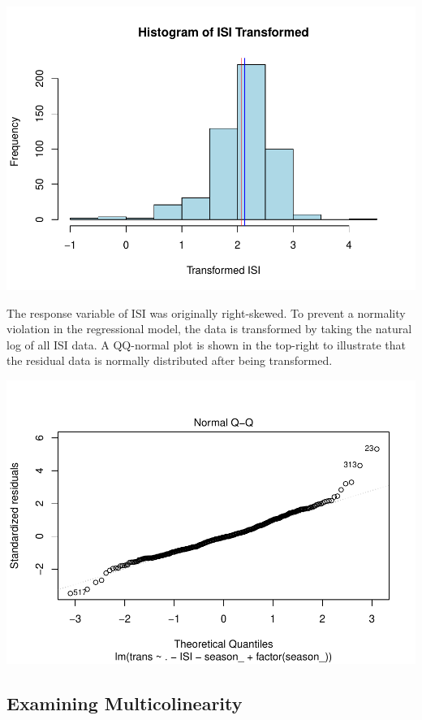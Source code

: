\documentclass[conference,final,]{IEEEtran}
\makeatletter
\def\maxwidth{\ifdim\Gin@nat@width>\linewidth\linewidth
\else\Gin@nat@width\fi}
\let\Oldincludegraphics\includegraphics
\renewcommand{\includegraphics}[1]{\Oldincludegraphics[width=\maxwidth]{#1}}
\makeatother
\begin{document}
\includegraphics{forest_fires_files/figure-latex/transform-1.pdf}

The response variable of ISI was originally right-skewed. To prevent a
normality violation in the regressional model, the data is transformed
by taking the natural log of all ISI data. A QQ-normal plot is shown in
the top-right to illustrate that the residual data is normally
distributed after being transformed.

\includegraphics{forest_fires_files/figure-latex/unnamed-chunk-2-1.pdf}

\hypertarget{examining-multicolinearity}{%
\subsection{Examining
Multicolinearity}\label{examining-multicolinearity}}
\end{document}
